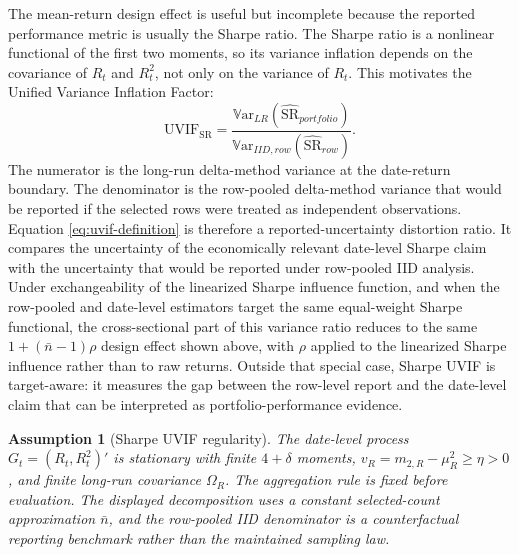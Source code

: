 \documentclass[12pt,a4paper]{article}
\newtheorem{assumption}{Assumption}
\newcommand{\Var}{\mathbb{V}\mathrm{ar}}
\newcommand{\SR}{\mathrm{SR}}
\newcommand{\UVIF}{\mathrm{UVIF}}
\begin{document}
The mean-return design effect is useful but incomplete because the
reported performance metric is usually the Sharpe ratio.  The Sharpe
ratio is a nonlinear functional of the first two moments, so its
variance inflation depends on the covariance of \(R_t\) and \(R_t^2\),
not only on the variance of \(R_t\).  This motivates the Unified
Variance Inflation Factor:
\begin{equation}
  \UVIF_{\SR}
  =
  \frac{\Var_{LR}(\widehat{\SR}_{portfolio})}
       {\Var_{IID,row}(\widehat{\SR}_{row})}.
  \label{eq:uvif-definition}
\end{equation}
The numerator is the long-run delta-method variance at the
date-return boundary.  The denominator is the row-pooled delta-method
variance that would be reported if the selected rows were treated as
independent observations.
Equation \eqref{eq:uvif-definition} is therefore a reported-uncertainty
distortion ratio.  It compares the uncertainty of the economically
relevant date-level Sharpe claim with the uncertainty that would be
reported under row-pooled IID analysis.  Under exchangeability of the
linearized Sharpe influence function, and when the row-pooled and
date-level estimators target the same equal-weight Sharpe functional,
the cross-sectional part of this variance ratio reduces to the same
\(1+(\bar n-1)\rho\) design effect shown above, with \(\rho\) applied to
the linearized Sharpe influence rather than to raw returns.  Outside
that special case, Sharpe UVIF is target-aware: it measures the gap
between the row-level report and the date-level claim that can be
interpreted as portfolio-performance evidence.

\begin{assumption}[Sharpe UVIF regularity]
The date-level process \(G_t=(R_t,R_t^2)'\) is stationary with finite
\(4+\delta\) moments, \(v_R=m_{2,R}-\mu_R^2\ge\eta>0\), and finite
long-run covariance \(\Omega_R\).  The aggregation rule is fixed before
evaluation.  The displayed decomposition uses a constant selected-count
approximation \(\bar n\), and the row-pooled IID denominator is a
counterfactual reporting benchmark rather than the maintained sampling
law.
\end{assumption}
\end{document}
